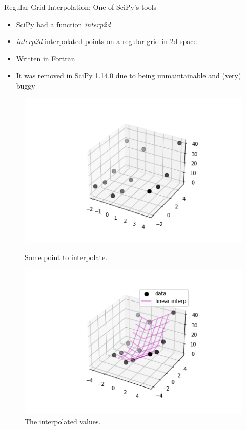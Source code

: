 \documentclass[12pt,xcolor=dvipsnames]{beamer}
\begin{document}
    \begin{frame}{Regular Grid Interpolation: One of SciPy's tools}
        \begin{itemize}
            \item SciPy had a function \textit{interp2d}
            \item \textit{interp2d} interpolated points on a regular grid in 2d space
            \item Written in Fortran
            \item It was removed in SciPy 1.14.0 due to being unmaintainable and (very) buggy
        \end{itemize}
        \begin{figure}
            \centering
            \begin{minipage}[b]{0.49\textwidth}
                \includegraphics[width=\textwidth]{static/pics/interpolation_points_2d}
                \caption{Some point to interpolate.}
            \end{minipage}
            \hfill
            \begin{minipage}[b]{0.49\textwidth}
                \includegraphics[width=\textwidth]{static/pics/interpolation_2d}
                \caption{The interpolated values.}
            \end{minipage}
        \end{figure}
    \end{frame}
\end{document}
